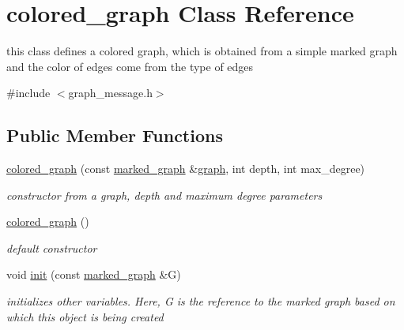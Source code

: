 \hypertarget{classcolored__graph}{}\section{colored\+\_\+graph Class Reference}
\label{classcolored__graph}


this class defines a colored graph, which is obtained from a simple marked graph and the color of edges come from the type of edges  




{\ttfamily \#include $<$graph\+\_\+message.\+h$>$}

\subsection*{Public Member Functions}
\begin{DoxyCompactItemize}
\item 
\hyperlink{classcolored__graph_a0374481a0474ac8e9b77689f74b5ed9b}{colored\+\_\+graph} (const \hyperlink{classmarked__graph}{marked\+\_\+graph} \&\hyperlink{classgraph}{graph}, int depth, int max\+\_\+degree)
\begin{DoxyCompactList}\small\item\em constructor from a graph, depth and maximum degree parameters \end{DoxyCompactList}\item 
\hyperlink{classcolored__graph_a104bcd930e68c04e4786678923bfdca1}{colored\+\_\+graph} ()
\begin{DoxyCompactList}\small\item\em default constructor \end{DoxyCompactList}\item 
void \hyperlink{classcolored__graph_a0e867afa9f5491dfc05bed10680f0709}{init} (const \hyperlink{classmarked__graph}{marked\+\_\+graph} \&G)
\begin{DoxyCompactList}\small\item\em initializes other variables. Here, G is the reference to the marked graph based on which this object is being created \end{DoxyCompactList}\end{DoxyCompactItemize}
